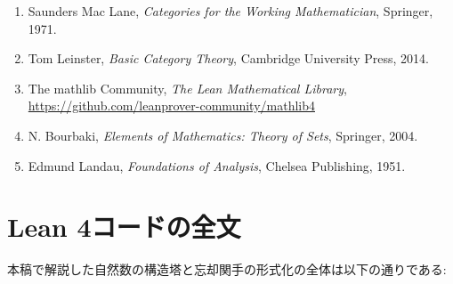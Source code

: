 \documentclass[a4paper,12pt]{article}
\theoremstyle{definition}
\begin{document}
\begin{enumerate}
\item Saunders Mac Lane, \textit{Categories for the Working Mathematician}, Springer, 1971.
\item Tom Leinster, \textit{Basic Category Theory}, Cambridge University Press, 2014.
\item The mathlib Community, \textit{The Lean Mathematical Library}, \url{https://github.com/leanprover-community/mathlib4}
\item N. Bourbaki, \textit{Elements of Mathematics: Theory of Sets}, Springer, 2004.
\item Edmund Landau, \textit{Foundations of Analysis}, Chelsea Publishing, 1951.
\end{enumerate}

\appendix

\section{Lean 4コードの全文}

本稿で解説した自然数の構造塔と忘却関手の形式化の全体は以下の通りである:
\end{document}
